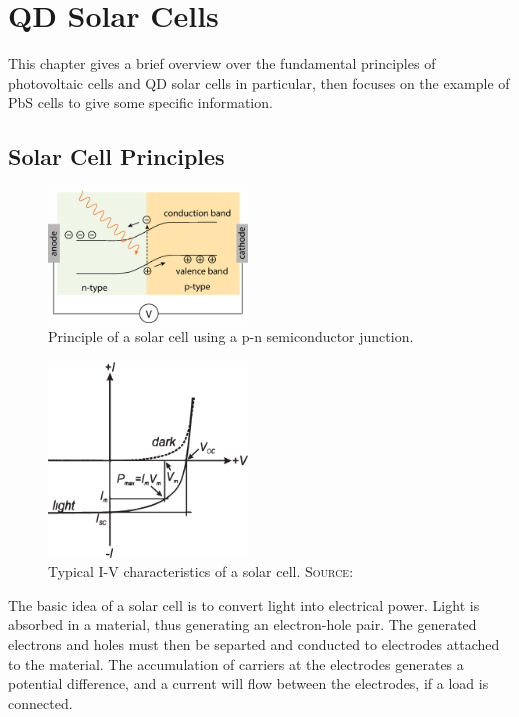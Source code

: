 \chapter{QD Solar Cells}

This chapter gives a brief overview over the fundamental principles of photovoltaic cells and QD solar cells in particular, then focuses on the example of PbS cells to give some specific information.

\section{Solar Cell Principles}

\begin{figure}
	\centering
	\includegraphics[width=200px]{Fig/SolarCell/pnSolarCell}
	\caption{Principle of a solar cell using a p-n semiconductor junction.}
	\label{fig:pnSolarCell}
\end{figure}

\begin{figure}
	\centering
	\includegraphics[width=200px]{Fig/SolarCell/IVsolarCell}
	\caption{Typical I-V characteristics of a solar cell. \scshape{Source:} \cite[p.427]{ChemRev}}
	\label{fig:IVsolarCell}
\end{figure}

The basic idea of a solar cell is to convert light into electrical power. Light is absorbed in a material, thus generating an electron-hole pair. The generated electrons and holes must then be separted and conducted to electrodes attached to the material. The accumulation of carriers at the electrodes generates a potential difference, and a current will flow between the electrodes, if a load is connected.

